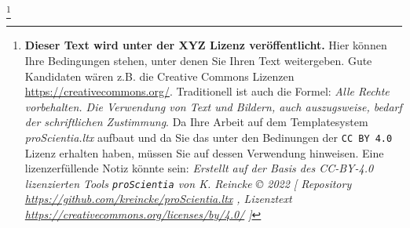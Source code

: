 
\footnote{\textbf{Dieser Text wird unter der XYZ Lizenz veröffentlicht.}
Hier können Ihre Bedingungen stehen, unter denen Sie Ihren Text weitergeben.
Gute Kandidaten wären z.B. die Creative Commons Lizenzen
\href{https://creativecommons.org/}{https://creativecommons.org/}. Traditionell ist auch die Formel: \emph{Alle Rechte vorbehalten. Die Verwendung von Text und Bildern, auch auszugsweise, bedarf der schriftlichen Zustimmung}. \newline
Da Ihre Arbeit auf dem Templatesystem \textit{proScientia.ltx} aufbaut und da Sie das unter den Bedinungen der \texttt{CC BY 4.0} Lizenz erhalten haben, müssen Sie auf dessen Verwendung hinweisen. Eine lizenzerfüllende Notiz könnte sein:
\newline
\textit{Erstellt auf der Basis des CC-BY-4.0 lizenzierten Tools \texttt{proScientia} von K. Reincke \copyright{} 2022 [
Repository \href{https://github.com/kreincke/proScientia.ltx}{https://github.com/kreincke/proScientia.ltx} ,
Lizenztext \href{https://creativecommons.org/licenses/by/4.0/}{https://creativecommons.org/licenses/by/4.0/} ]
}}
